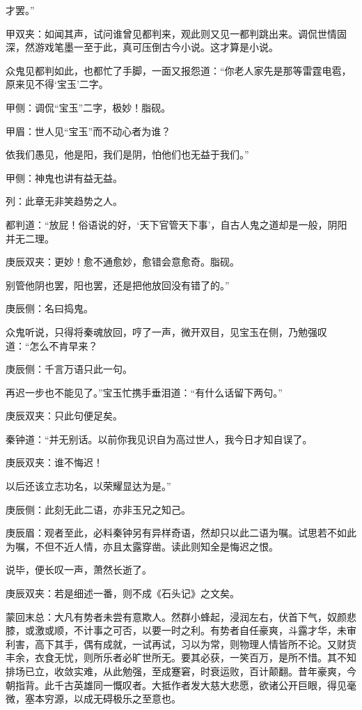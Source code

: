 \begin{parag}
才罢。”\begin{note}甲双夹：如闻其声，试问谁曾见都判来，观此则又见一都判跳出来。调侃世情固深，然游戏笔墨一至于此，真可压倒古今小说。这才算是小说。\end{note}众鬼见都判如此，也都忙了手脚，一面又报怨道：“你老人家先是那等雷霆电雹，原来见不得‘宝玉’二字。\begin{note}甲侧：调侃“宝玉”二字，极妙！脂砚。\end{note}\begin{note}甲眉：世人见“宝玉”而不动心者为谁？\end{note}依我们愚见，他是阳，我们是阴，怕他们也无益于我们。”\begin{note}甲侧：神鬼也讲有益无益。\end{note}\begin{note}列：此章无非笑趋势之人。\end{note}都判道：“放屁！俗语说的好，‘天下官管天下事’，自古人鬼之道却是一般，阴阳并无二理。\begin{note}庚辰双夹：更妙！愈不通愈妙，愈错会意愈奇。脂砚。\end{note}别管他阴也罢，阳也罢，还是把他放回没有错了的。”\begin{note}庚辰侧：名曰捣鬼。\end{note}众鬼听说，只得将秦魂放回，哼了一声，微开双目，见宝玉在侧，乃勉强叹道：“怎么不肯早来？\begin{note}庚辰侧：千言万语只此一句。\end{note}再迟一步也不能见了。”宝玉忙携手垂泪道：“有什么话留下两句。”\begin{note}庚辰双夹：只此句便足矣。\end{note}秦钟道：“并无别话。以前你我见识自为高过世人，我今日才知自误了。\begin{note}庚辰双夹：谁不悔迟！\end{note}以后还该立志功名，以荣耀显达为是。”\begin{note}庚辰侧：此刻无此二语，亦非玉兄之知己。\end{note}\begin{note}庚辰眉：观者至此，必料秦钟另有异样奇语，然却只以此二语为嘱。试思若不如此为嘱，不但不近人情，亦且太露穿凿。读此则知全是悔迟之恨。\end{note}说毕，便长叹一声，萧然长逝了。\begin{note}庚辰双夹：若是细述一番，则不成《石头记》之文矣。\end{note}
\end{parag}


\begin{parag}
    \begin{note}蒙回末总：大凡有势者未尝有意欺人。然群小蜂起，浸润左右，伏首下气，奴颜悲膝，或激或顺，不计事之可否，以要一时之利。有势者自任豪爽，斗露才华，未审利害，高下其手，偶有成就，一试再试，习以为常，则物理人情皆所不论。又财货丰余，衣食无忧，则所乐者必旷世所无。要其必获，一笑百万，是所不惜。其不知排场已立，收敛实难，从此勉强，至成蹇窘，时衰运败，百计颠翻。昔年豪爽，今朝指背。此千古英雄同一慨叹者。大抵作者发大慈大悲愿，欲诸公开巨眼，得见毫微，塞本穷源，以成无碍极乐之至意也。\end{note}
\end{parag}
